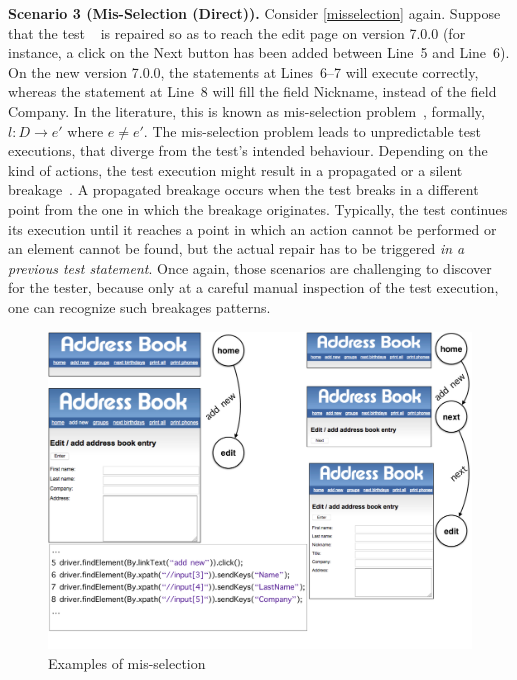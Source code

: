 \noindent
\textbf{Scenario 3 (Mis-Selection (Direct)).} Consider \autoref{misselection} again. 
Suppose that the test~\textcircled{} is repaired so as to reach the edit page on version 7.0.0 (for instance, a click on the Next button has been added between Line~5 and Line~6). On the new version 7.0.0, the statements at Lines~6--7 will execute correctly, whereas the statement at Line~8 will fill the field Nickname, instead of the field Company. In the literature, this is known as mis-selection problem~\cite{Choudhary:2011:WWA:2002931.2002935}, formally, $l: D \rightarrow e'$ where $e \ne e'$. The mis-selection problem leads to unpredictable test executions, that diverge from the test's intended behaviour. Depending on the kind of actions, the test execution might result in a propagated or a silent breakage~\cite{Hammoudi-2016-ICST}. A propagated breakage occurs when the test breaks in a different point from the one in which the breakage originates. Typically, the test continues its execution until it reaches a point in which an action cannot be performed or an element cannot be found, but the actual repair has to be triggered \textit{in a previous test statement}. Once again, those scenarios are challenging to discover for the tester, because only at a careful manual inspection of the test execution, one can recognize such breakages patterns.



\begin{figure}[t]
\centering
\includegraphics[trim={0cm 1cm 0cm 0cm},clip,scale=0.23]{images/misselection}
\caption{Examples of mis-selection}
\label{misselection}
\end{figure}

